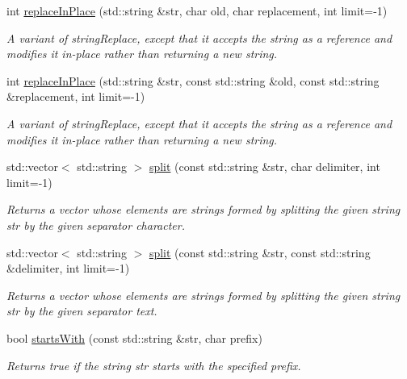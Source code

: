 \begin{DoxyCompactItemize}
int \mbox{\hyperlink{namespacesgl_1_1priv_1_1strlib_a6ef4063d045756e26512bde874824042}{replace\+In\+Place}} (std\+::string \&str, char old, char replacement, int limit=-\/1)
\begin{DoxyCompactList}\small\item\em A variant of string\+Replace, except that it accepts the string as a reference and modifies it in-\/place rather than returning a new string. \end{DoxyCompactList}\item 
int \mbox{\hyperlink{namespacesgl_1_1priv_1_1strlib_a96605c78e69e67a8bd3909f7969fe8cf}{replace\+In\+Place}} (std\+::string \&str, const std\+::string \&old, const std\+::string \&replacement, int limit=-\/1)
\begin{DoxyCompactList}\small\item\em A variant of string\+Replace, except that it accepts the string as a reference and modifies it in-\/place rather than returning a new string. \end{DoxyCompactList}\item 
std\+::vector$<$ std\+::string $>$ \mbox{\hyperlink{namespacesgl_1_1priv_1_1strlib_ad26db0032c572d1b848ca89b98cf6cab}{split}} (const std\+::string \&str, char delimiter, int limit=-\/1)
\begin{DoxyCompactList}\small\item\em Returns a vector whose elements are strings formed by splitting the given string \textquotesingle{}str\textquotesingle{} by the given separator character. \end{DoxyCompactList}\item 
std\+::vector$<$ std\+::string $>$ \mbox{\hyperlink{namespacesgl_1_1priv_1_1strlib_addd79cd11aaf0c887c9190aee4457cfb}{split}} (const std\+::string \&str, const std\+::string \&delimiter, int limit=-\/1)
\begin{DoxyCompactList}\small\item\em Returns a vector whose elements are strings formed by splitting the given string \textquotesingle{}str\textquotesingle{} by the given separator text. \end{DoxyCompactList}\item 
bool \mbox{\hyperlink{namespacesgl_1_1priv_1_1strlib_a612efd2a5aec9ec46eb60da87788f522}{starts\+With}} (const std\+::string \&str, char prefix)
\begin{DoxyCompactList}\small\item\em Returns {\ttfamily true} if the string {\ttfamily str} starts with the specified prefix. \end{DoxyCompactList}\item 

\end{DoxyCompactItemize}
